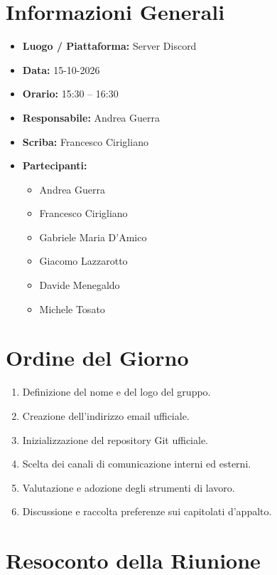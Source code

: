 \documentclass[11pt, a4paper]{article}
\newcommand{\DocDate}{15-10-2026}
\begin{document}
\section{Informazioni Generali}
\begin{itemize}
    \item \textbf{Luogo / Piattaforma:} Server Discord
    \item \textbf{Data:} \DocDate
    \item \textbf{Orario:} 15:30 -- 16:30
    \item \textbf{Responsabile:} Andrea Guerra
    \item \textbf{Scriba:} Francesco Cirigliano
    \item \textbf{Partecipanti:}
        \begin{itemize}
            \item Andrea Guerra
            \item Francesco Cirigliano
            \item Gabriele Maria D'Amico
            \item Giacomo Lazzarotto
            \item Davide Menegaldo
            \item Michele Tosato
        \end{itemize}
\end{itemize}
\clearpage
\section{Ordine del Giorno}
\begin{enumerate}
    \item Definizione del nome e del logo del gruppo.
    \item Creazione dell'indirizzo email ufficiale.
    \item Inizializzazione del repository Git ufficiale.
    \item Scelta dei canali di comunicazione interni ed esterni.
    \item Valutazione e adozione degli strumenti di lavoro.
    \item Discussione e raccolta preferenze sui capitolati d'appalto.
\end{enumerate}

\section{Resoconto della Riunione}
\end{document}
